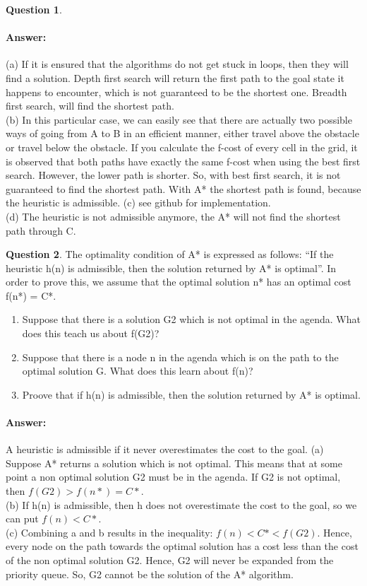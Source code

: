 \documentclass[11pt,a4paper]{article}
\theoremstyle{definition}%
\newtheorem{Q}{Question}[] %
\newcommand{\reponse}[1]{%
\ifthenelse {\boolean{corrige}} {\paragraph{Answer:} \color{darkblue}   #1\color{black}} {}
}
\begin{document}
\begin{Q}
\reponse{
    (a) If it is ensured that the algorithms do not get stuck in loops, then they will find a
solution. Depth first search will return the first path to the goal state it happens to
encounter, which is not guaranteed to be the shortest one. Breadth first search, will
find the shortest path.\\
(b) In this particular case, we can easily see that there are actually two possible ways of
going from A to B in an efficient manner, either travel above the obstacle or travel
below the obstacle. If you calculate the f-cost of every cell in the grid, it is observed
that both paths have exactly the same f-cost when using the best first search. However,
the lower path is shorter. So, with best first search, it is not guaranteed to find the
shortest path. With A* the shortest path is found, because the heuristic is admissible.
(c) see github for implementation.\\
(d) The heuristic is not admissible anymore, the A* will not find the shortest path through C.

}
\end{Q}


\begin{Q}
    The optimality condition of A* is expressed as follows: “If the heuristic h(n) is admissible,
then the solution returned by A* is optimal”. In order to prove this, we assume that the
optimal solution n* has an optimal cost f(n*) = C*.

\begin{enumerate}
    \item Suppose that there is a solution G2 which is not optimal in the agenda. What does
    this teach us about f(G2)?
    \item Suppose that there is a node n in the agenda which is on the path to the optimal
    solution G. What does this learn about f(n)?
    \item Proove that if h(n) is admissible, then the solution returned by A* is optimal.
\end{enumerate}
\reponse{
    A heuristic is admissible if it never overestimates the cost to the goal.
(a) Suppose A* returns a solution which is not optimal. This means that at some point a
non optimal solution G2 must be in the agenda. If G2 is not optimal, then $f(G2) >
f(n*) = C*$.\\
(b) If h(n) is admissible, then h does not overestimate the cost to the goal, so we can put
$f(n) < C*$.\\
(c) Combining a and b results in the inequality: $f(n) < C* < f(G2)$. Hence, every node
on the path towards the optimal solution has a cost less than the cost of the non
optimal solution G2. Hence, G2 will never be expanded from the priority queue. So,
G2 cannot be the solution of the A* algorithm.
}
\end{Q}
\end{document}
